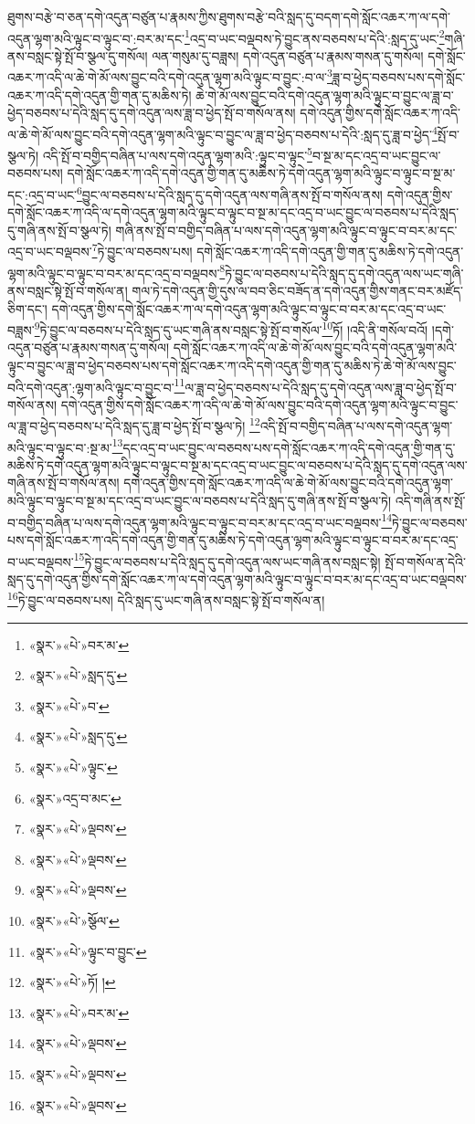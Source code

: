 ཐུགས་བརྩེ་བ་ཅན་དགེ་འདུན་བཙུན་པ་རྣམས་ཀྱིས་ཐུགས་བརྩེ་བའི་སླད་དུ་བདག་དགེ་སློང་འཆར་ཀ་ལ་དགེ་འདུན་ལྷག་མའི་ལྟུང་བ་ལྟུང་བ་:བར་མ་དང་\footnote{«སྣར་»«པེ་»བར་མ་}འདྲ་བ་ཡང་བལྡབས་ཏེ་བྱུང་ནས་བཅབས་པ་དེའི་:སླད་དུ་ཡང་\footnote{«སྣར་»«པེ་»སླད་དུ་}གཞི་ནས་བསླང་སྟེ་སྤོ་བ་སྩལ་དུ་གསོལ། ལན་གསུམ་དུ་བཟླས། དགེ་འདུན་བཙུན་པ་རྣམས་གསན་དུ་གསོལ། དགེ་སློང་འཆར་ཀ་འདི་ལ་ཆེ་གེ་མོ་ལས་བྱུང་བའི་དགེ་འདུན་ལྷག་མའི་ལྟུང་བ་བྱུང་:བ་ལ་\footnote{«སྣར་»«པེ་»བ་}ཟླ་བ་ཕྱེད་བཅབས་པས་དགེ་སློང་འཆར་ཀ་འདི་དགེ་འདུན་གྱི་གན་དུ་མཆིས་ཏེ། ཆེ་གེ་མོ་ལས་བྱུང་བའི་དགེ་འདུན་ལྷག་མའི་ལྟུང་བ་བྱུང་ལ་ཟླ་བ་ཕྱེད་བཅབས་པ་དེའི་སླད་དུ་དགེ་འདུན་ལས་ཟླ་བ་ཕྱེད་སྤོ་བ་གསོལ་ནས། དགེ་འདུན་གྱིས་དགེ་སློང་འཆར་ཀ་འདི་ལ་ཆེ་གེ་མོ་ལས་བྱུང་བའི་དགེ་འདུན་ལྷག་མའི་ལྟུང་བ་བྱུང་ལ་ཟླ་བ་ཕྱེད་བཅབས་པ་དེའི་:སླད་དུ་ཟླ་བ་ཕྱེད་\footnote{«སྣར་»«པེ་»སླད་དུ་}སྤོ་བ་སྩལ་ཏེ། འདི་སྤོ་བ་བགྱིད་བཞིན་པ་ལས་དགེ་འདུན་ལྷག་མའི་:ལྟུང་བ་ལྟུང་\footnote{«སྣར་»«པེ་»ལྟུང་}བ་སྔ་མ་དང་འདྲ་བ་ཡང་བྱུང་ལ་བཅབས་པས། དགེ་སློང་འཆར་ཀ་འདི་དགེ་འདུན་གྱི་གན་དུ་མཆིས་ཏེ་དགེ་འདུན་ལྷག་མའི་ལྟུང་བ་ལྟུང་བ་སྔ་མ་དང་:འདྲ་བ་ཡང་\footnote{«སྣར་»འདྲ་བ་མང་}བྱུང་ལ་བཅབས་པ་དེའི་སླད་དུ་དགེ་འདུན་ལས་གཞི་ནས་སྤོ་བ་གསོལ་ནས། དགེ་འདུན་གྱིས་དགེ་སློང་འཆར་ཀ་འདི་ལ་དགེ་འདུན་ལྷག་མའི་ལྟུང་བ་ལྟུང་བ་སྔ་མ་དང་འདྲ་བ་ཡང་བྱུང་ལ་བཅབས་པ་དེའི་སླད་དུ་གཞི་ནས་སྤོ་བ་སྩལ་ཏེ། གཞི་ནས་སྤོ་བ་བགྱིད་བཞིན་པ་ལས་དགེ་འདུན་ལྷག་མའི་ལྟུང་བ་ལྟུང་བ་བར་མ་དང་འདྲ་བ་ཡང་བལྡབས་\footnote{«སྣར་»«པེ་»ལྡབས་}ཏེ་བྱུང་ལ་བཅབས་པས། དགེ་སློང་འཆར་ཀ་འདི་དགེ་འདུན་གྱི་གན་དུ་མཆིས་ཏེ་དགེ་འདུན་ལྷག་མའི་ལྟུང་བ་ལྟུང་བ་བར་མ་དང་འདྲ་བ་བལྡབས་\footnote{«སྣར་»«པེ་»ལྡབས་}ཏེ་བྱུང་ལ་བཅབས་པ་དེའི་སླད་དུ་དགེ་འདུན་ལས་ཡང་གཞི་ནས་བསླང་སྟེ་སྤོ་བ་གསོལ་ན། གལ་ཏེ་དགེ་འདུན་གྱི་དུས་ལ་བབ་ཅིང་བཟོད་ན་དགེ་འདུན་གྱིས་གནང་བར་མཛོད་ཅིག་དང་། དགེ་འདུན་གྱིས་དགེ་སློང་འཆར་ཀ་ལ་དགེ་འདུན་ལྷག་མའི་ལྟུང་བ་ལྟུང་བ་བར་མ་དང་འདྲ་བ་ཡང་བཟླས་\footnote{«སྣར་»«པེ་»ལྡབས་}ཏེ་བྱུང་ལ་བཅབས་པ་དེའི་སླད་དུ་ཡང་གཞི་ནས་བསླང་སྟེ་སྤོ་བ་གསོལ་\footnote{«སྣར་»«པེ་»སྩོལ་}ཏོ། །འདི་ནི་གསོལ་བའོ། །དགེ་འདུན་བཙུན་པ་རྣམས་གསན་དུ་གསོལ། དགེ་སློང་འཆར་ཀ་འདི་ལ་ཆེ་གེ་མོ་ལས་བྱུང་བའི་དགེ་འདུན་ལྷག་མའི་ལྟུང་བ་བྱུང་ལ་ཟླ་བ་ཕྱེད་བཅབས་པས་དགེ་སློང་འཆར་ཀ་འདི་དགེ་འདུན་གྱི་གན་དུ་མཆིས་ཏེ་ཆེ་གེ་མོ་ལས་བྱུང་བའི་དགེ་འདུན་:ལྷག་མའི་ལྟུང་བ་བྱུང་བ་\footnote{«སྣར་»«པེ་»ལྟུང་བ་བྱུང་}ལ་ཟླ་བ་ཕྱེད་བཅབས་པ་དེའི་སླད་དུ་དགེ་འདུན་ལས་ཟླ་བ་ཕྱེད་སྤོ་བ་གསོལ་ནས། དགེ་འདུན་གྱིས་དགེ་སློང་འཆར་ཀ་འདི་ལ་ཆེ་གེ་མོ་ལས་བྱུང་བའི་དགེ་འདུན་ལྷག་མའི་ལྟུང་བ་བྱུང་ལ་ཟླ་བ་ཕྱེད་བཅབས་པ་དེའི་སླད་དུ་ཟླ་བ་ཕྱེད་སྤོ་བ་སྩལ་ཏེ། \footnote{«སྣར་»«པེ་»ཏོ། ། }འདི་སྤོ་བ་བགྱིད་བཞིན་པ་ལས་དགེ་འདུན་ལྷག་མའི་ལྟུང་བ་ལྟུང་བ་:སྔ་མ་\footnote{«སྣར་»«པེ་»བར་མ་}དང་འདྲ་བ་ཡང་བྱུང་ལ་བཅབས་པས་དགེ་སློང་འཆར་ཀ་འདི་དགེ་འདུན་གྱི་གན་དུ་མཆིས་ཏེ་དགེ་འདུན་ལྷག་མའི་ལྟུང་བ་ལྟུང་བ་སྔ་མ་དང་འདྲ་བ་ཡང་བྱུང་ལ་བཅབས་པ་དེའི་སླད་དུ་དགེ་འདུན་ལས་གཞི་ནས་སྤོ་བ་གསོལ་ནས། དགེ་འདུན་གྱིས་དགེ་སློང་འཆར་ཀ་འདི་ལ་ཆེ་གེ་མོ་ལས་བྱུང་བའི་དགེ་འདུན་ལྷག་མའི་ལྟུང་བ་ལྟུང་བ་སྔ་མ་དང་འདྲ་བ་ཡང་བྱུང་ལ་བཅབས་པ་དེའི་སླད་དུ་གཞི་ནས་སྤོ་བ་སྩལ་ཏེ། འདི་གཞི་ནས་སྤོ་བ་བགྱིད་བཞིན་པ་ལས་དགེ་འདུན་ལྷག་མའི་ལྟུང་བ་ལྟུང་བ་བར་མ་དང་འདྲ་བ་ཡང་བལྡབས་\footnote{«སྣར་»«པེ་»ལྡབས་}ཏེ་བྱུང་ལ་བཅབས་པས་དགེ་སློང་འཆར་ཀ་འདི་དགེ་འདུན་གྱི་གན་དུ་མཆིས་ཏེ་དགེ་འདུན་ལྷག་མའི་ལྟུང་བ་ལྟུང་བ་བར་མ་དང་འདྲ་བ་ཡང་བལྡབས་\footnote{«སྣར་»«པེ་»ལྡབས་}ཏེ་བྱུང་ལ་བཅབས་པ་དེའི་སླད་དུ་དགེ་འདུན་ལས་ཡང་གཞི་ནས་བསླང་སྟེ། སྤོ་བ་གསོལ་ན་དེའི་སླད་དུ་དགེ་འདུན་གྱིས་དགེ་སློང་འཆར་ཀ་ལ་དགེ་འདུན་ལྷག་མའི་ལྟུང་བ་ལྟུང་བ་བར་མ་དང་འདྲ་བ་ཡང་བལྡབས་\footnote{«སྣར་»«པེ་»ལྡབས་}ཏེ་བྱུང་ལ་བཅབས་པས། དེའི་སླད་དུ་ཡང་གཞི་ནས་བསླང་སྟེ་སྤོ་བ་གསོལ་ན། 